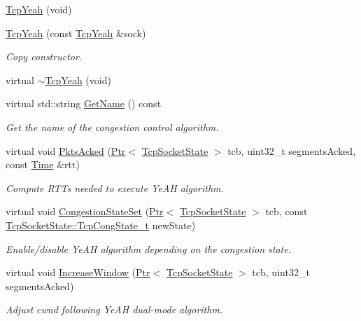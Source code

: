 \begin{DoxyCompactItemize}
\item 
\hyperlink{classns3_1_1TcpYeah_aaf679301f97e5643af990b13976ea8db}{Tcp\+Yeah} (void)
\item 
\hyperlink{classns3_1_1TcpYeah_aa0688d231652a75d221b328cd8c79dec}{Tcp\+Yeah} (const \hyperlink{classns3_1_1TcpYeah}{Tcp\+Yeah} \&sock)
\begin{DoxyCompactList}\small\item\em Copy constructor. \end{DoxyCompactList}\item 
virtual \hyperlink{classns3_1_1TcpYeah_a87d4bf666bcc5e3f69474335ab499fde}{$\sim$\+Tcp\+Yeah} (void)
\item 
virtual std\+::string \hyperlink{classns3_1_1TcpYeah_a55437380bf00da00ede56cc44be0b5d2}{Get\+Name} () const 
\begin{DoxyCompactList}\small\item\em Get the name of the congestion control algorithm. \end{DoxyCompactList}\item 
virtual void \hyperlink{classns3_1_1TcpYeah_a2423d9c6a6aea3c8e58749c9219d2fbd}{Pkts\+Acked} (\hyperlink{classns3_1_1Ptr}{Ptr}$<$ \hyperlink{classns3_1_1TcpSocketState}{Tcp\+Socket\+State} $>$ tcb, uint32\+\_\+t segments\+Acked, const \hyperlink{classns3_1_1Time}{Time} \&rtt)
\begin{DoxyCompactList}\small\item\em Compute R\+T\+Ts needed to execute Ye\+AH algorithm. \end{DoxyCompactList}\item 
virtual void \hyperlink{classns3_1_1TcpYeah_ad3d8b9d44b3a29ab9f30aabc4af9c08a}{Congestion\+State\+Set} (\hyperlink{classns3_1_1Ptr}{Ptr}$<$ \hyperlink{classns3_1_1TcpSocketState}{Tcp\+Socket\+State} $>$ tcb, const \hyperlink{classns3_1_1TcpSocketState_a6fc313945a33d48fd60cbffe0c787b19}{Tcp\+Socket\+State\+::\+Tcp\+Cong\+State\+\_\+t} new\+State)
\begin{DoxyCompactList}\small\item\em Enable/disable Ye\+AH algorithm depending on the congestion state. \end{DoxyCompactList}\item 
virtual void \hyperlink{classns3_1_1TcpYeah_aa1efa60adbcb1dfad8d188deef7ed2ea}{Increase\+Window} (\hyperlink{classns3_1_1Ptr}{Ptr}$<$ \hyperlink{classns3_1_1TcpSocketState}{Tcp\+Socket\+State} $>$ tcb, uint32\+\_\+t segments\+Acked)
\begin{DoxyCompactList}\small\item\em Adjust cwnd following Ye\+AH dual-\/mode algorithm. \end{DoxyCompactList}\item 

\end{DoxyCompactItemize}
